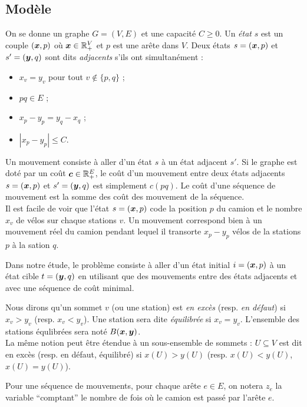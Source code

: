 \subsection{Modèle}

On se donne un graphe $G=(V,E)$ et une capacité $C \ge 0$. Un \emph{état} $s$ est un couple $(\boldsymbol{x},p)$ où $\boldsymbol{x} \in \mathbb{R}^V_+$ et $p$ est une arête dans $V$. Deux états $s=(\boldsymbol{x},p)$ et $s'=(\boldsymbol{y},q)$ sont dits \emph{adjacents} s'ils ont simultanément :
\begin{itemize}
\item $x_v=y_v$ pour tout $v \notin \{p,q\}$ ;
\item $pq \in E$ ;
\item $x_p-y_p = y_q-x_q$ ;
\item $\left| x_p-y_p \right| \le C$.
\end{itemize}

Un mouvement consiste à aller d'un état $s$ à un état adjacent $s'$. Si le graphe est doté par un coût $\boldsymbol{c} \in \mathbb{R}^E_+$, le coût d'un mouvement entre deux états adjacents $s=(\boldsymbol{x},p)$ et $s'=(\boldsymbol{y},q)$ est simplement $c(pq)$. Le coût d'une séquence de mouvement est la somme des coût des mouvement de la séquence.
\\

Il est facile de voir que l'état $s=(\boldsymbol{x},p)$ code la position $p$ du camion et le nombre $x_v$ de vélos sur chaque stations $v$. Un mouvement correspond bien à un mouvement réel du camion pendant lequel il transorte $x_p-y_p$ vélos de la stations $p$ à la sation $q$.

Dans notre étude, le problème consiste à aller d'un état initial $i=(\boldsymbol{x},p)$ à un état cible $t=(\boldsymbol{y},q)$ en utilisant que des mouvements entre des états adjacents et avec une séquence de coût minimal.

Nous dirons qu'un sommet $v$ (ou une station) est \emph{en excès} (resp. \emph{en défaut}) si $x_v > y_v$ (resp. $x_v < y_v$). Une station sera dite \emph{équilibrée} si $x_v=y_v$. L'ensemble des stations équlibrées sera noté $B(\boldsymbol{x},\boldsymbol{y})$.
\\
La même notion peut être étendue à un sous-ensemble de sommets : $U \subseteq V$ est dit en excès (resp. en défaut, équilibré) si $x(U) > y(U)$ (resp. $x(U) < y(U)$, $x(U) = y(U)$).

Pour une séquence de mouvements, pour chaque arête $e \in E$, on notera $z_e$ la variable ``comptant'' le nombre de fois où le camion est passé par l'arête $e$.

